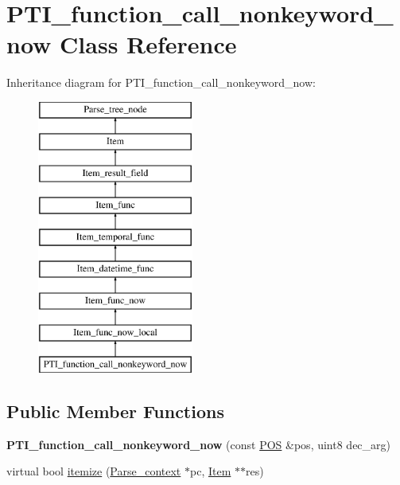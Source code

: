 \hypertarget{classPTI__function__call__nonkeyword__now}{}\section{P\+T\+I\+\_\+function\+\_\+call\+\_\+nonkeyword\+\_\+now Class Reference}
\label{classPTI__function__call__nonkeyword__now}
Inheritance diagram for P\+T\+I\+\_\+function\+\_\+call\+\_\+nonkeyword\+\_\+now\+:\begin{figure}[H]
\begin{center}
\leavevmode
\includegraphics[height=9.000000cm]{classPTI__function__call__nonkeyword__now}
\end{center}
\end{figure}
\subsection*{Public Member Functions}
\begin{DoxyCompactItemize}
\item 
\mbox{\label{classPTI__function__call__nonkeyword__now_a1ccacc85f228034882e109bfac5a533e}} 
{\bfseries P\+T\+I\+\_\+function\+\_\+call\+\_\+nonkeyword\+\_\+now} (const \mbox{\hyperlink{structYYLTYPE}{P\+OS}} \&pos, uint8 dec\+\_\+arg)
\item 
virtual bool \mbox{\hyperlink{classPTI__function__call__nonkeyword__now_ac39ec6c94214b8cc9aa5ccbdb8a58e04}{itemize}} (\mbox{\hyperlink{structParse__context}{Parse\+\_\+context}} $\ast$pc, \mbox{\hyperlink{classItem}{Item}} $\ast$$\ast$res)
\end{DoxyCompactItemize}
